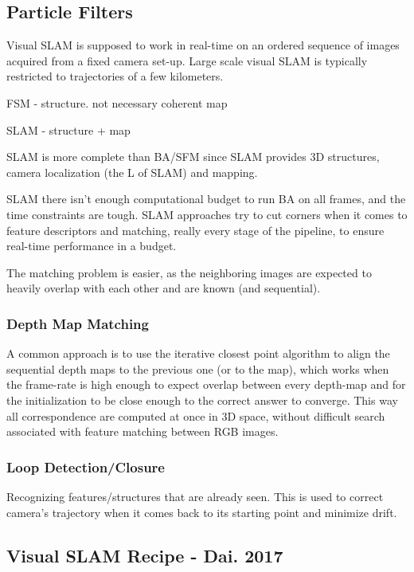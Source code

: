 \begin{enumerate}
\subsection{Particle Filters}

Visual SLAM is supposed to work in real-time on an ordered sequence of images acquired from a fixed camera set-up. Large scale visual SLAM is typically restricted to trajectories of a few kilometers.

FSM - structure. not necessary coherent map

SLAM - structure + map

SLAM is more complete than BA/SFM since SLAM provides 3D structures, camera localization (the L of SLAM) and mapping.

SLAM there isn’t enough computational budget to run BA on all frames, and the time constraints are tough. SLAM approaches try to cut corners when it comes to feature descriptors and matching, really every stage of the pipeline, to ensure real-time performance in a budget. 

The matching problem is easier, as the  neighboring images are expected to heavily overlap with each other and are known (and sequential).

\subsubsection{Depth Map Matching}

A common approach is to use the iterative closest point algorithm to align the sequential depth maps to the previous one (or to the map), which works when the frame-rate is high enough to expect overlap between every depth-map and for the initialization to be close enough to the correct answer to converge. This way all correspondence are computed at once in 3D space, without difficult search associated with feature matching between RGB images.

\subsubsection{Loop Detection/Closure}

Recognizing features/structures that are already seen. This is used to correct camera's trajectory when it comes back to its starting point and minimize drift.

\subsection{Visual SLAM Recipe - Dai. 2017}


\end{enumerate}
